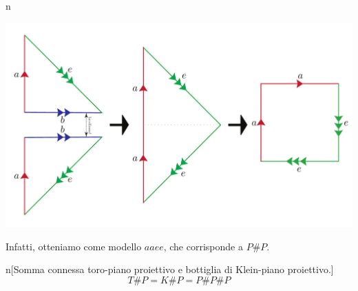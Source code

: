 \begin{remark}{n}
\begin{center}
	\includegraphics[trim=0cm 0cm 0cm 0cm, clip, scale=0.3]{images/kleintoprojdouble2.pdf}
\end{center}
Infatti, otteniamo come modello $aaee$, che corrisponde a $P\# P$.
\end{remark}
\begin{lemma}{n}[Somma connessa toro-piano proiettivo e bottiglia di Klein-piano proiettivo.]
	\begin{equation*}
		T\# P= K\# P=P\# P\# P
	\end{equation*}
\end{lemma}
